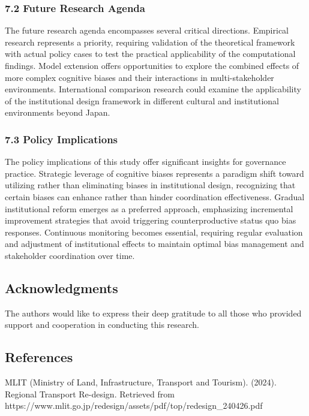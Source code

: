 \subsubsection{7.2 Future Research Agenda}\label{future-research-agenda}

The future research agenda encompasses several critical directions.
Empirical research represents a priority, requiring validation of the
theoretical framework with actual policy cases to test the practical
applicability of the computational findings. Model extension offers
opportunities to explore the combined effects of more complex cognitive
biases and their interactions in multi-stakeholder environments.
International comparison research could examine the applicability of the
institutional design framework in different cultural and institutional
environments beyond Japan.

\subsubsection{7.3 Policy Implications}\label{policy-implications}

The policy implications of this study offer significant insights for
governance practice. Strategic leverage of cognitive biases represents a
paradigm shift toward utilizing rather than eliminating biases in
institutional design, recognizing that certain biases can enhance rather
than hinder coordination effectiveness. Gradual institutional reform
emerges as a preferred approach, emphasizing incremental improvement
strategies that avoid triggering counterproductive status quo bias
responses. Continuous monitoring becomes essential, requiring regular
evaluation and adjustment of institutional effects to maintain optimal
bias management and stakeholder coordination over time.

\subsection{Acknowledgments}\label{acknowledgments}

The authors would like to express their deep gratitude to all those who
provided support and cooperation in conducting this research.

\subsection{References}\label{references}

MLIT (Ministry of Land, Infrastructure, Transport and Tourism). (2024).
Regional Transport Re-design. Retrieved from
https://www.mlit.go.jp/redesign/assets/pdf/top/redesign\_240426.pdf


